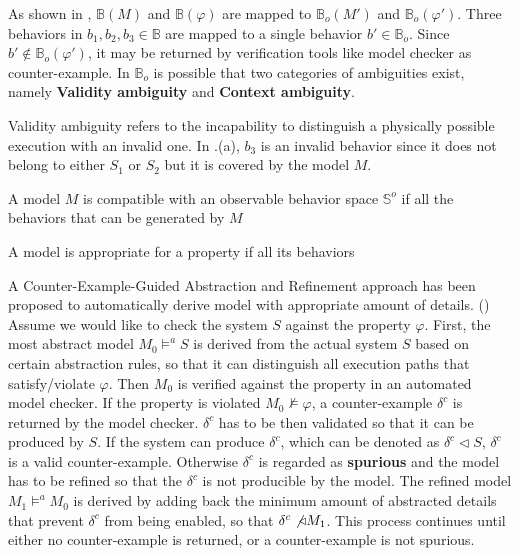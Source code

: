 As shown in , $\mathbb{B}(M)$ and $\mathbb{B}(\varphi)$ are mapped to $\mathbb{B}_o(M')$ and $\mathbb{B}_o(\varphi')$. Three behaviors in $b_1,b_2,b_3\in\mathbb{B}$ are mapped to a single behavior $b'\in\mathbb{B}_o$. Since $b'\not\in\mathbb{B}_o(\varphi')$, it may be returned by verification tools like model checker as counter-example. In $\mathbb{B}_o$ is possible that two categories of ambiguities exist, namely \textbf{Validity ambiguity} and \textbf{Context ambiguity}. %

Validity ambiguity refers to the incapability to distinguish a physically possible execution with an invalid one. In .(a), $b_3$ is an invalid behavior since it does not belong to either $S_1$ or $S_2$ but it is covered by the model $M$. 

A model $M$ is compatible with an observable behavior space $\mathbb{S}^o$ if all the behaviors that can be generated by $M$ 

A model is appropriate for a property if all its behaviors  



A Counter-Example-Guided Abstraction and Refinement approach has been proposed to automatically derive model with appropriate amount of details. (\cite{CEGAR}) Assume we would like to check the system $S$ against the property $\varphi$. First, the most abstract model $M_0\models^a S$ is derived from the actual system $S$ based on certain abstraction rules, so that it can distinguish all execution paths that satisfy/violate $\varphi$. Then $M_0$ is verified against the property in an automated model checker. If the property is violated $M_0\not\models\varphi$, a counter-example $\delta^c$ is returned by the model checker. $\delta^c$ has to be then validated so that it can be produced by $S$. If the system can produce $\delta^c$, which can be denoted as $\delta^c\triangleleft S$, $\delta^c$ is a valid counter-example. Otherwise $\delta^c$ is regarded as \textbf{spurious} and the model has to be refined so that the $\delta^c$ is not producible by the model. The refined model $M_1\models^a M_0$ is derived by adding back the minimum amount of abstracted details that prevent $\delta^c$ from being enabled, so that $\delta^c\not\triangleleft M_1$. This process continues until either no counter-example is returned, or a counter-example is not spurious. 

